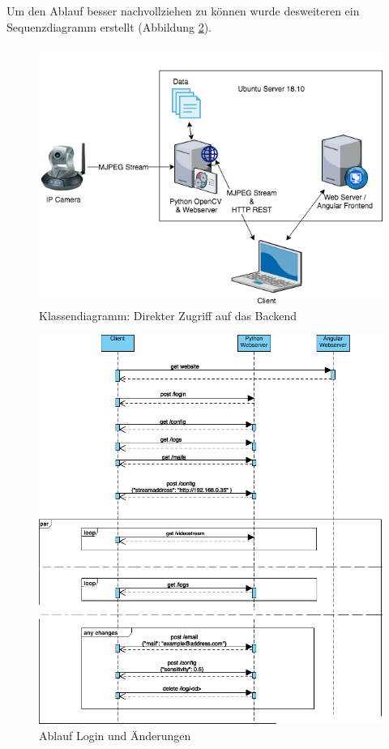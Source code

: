 Um den Ablauf besser nachvollziehen zu können wurde desweiteren ein Sequenzdiagramm erstellt (Abbildung \ref{img:sequencediagram}).

\begin{figure}[]
	\centering
	\includegraphics[width=\textwidth]{content/pictures/architecture-change.png}
	\caption{Klassendiagramm: Direkter Zugriff auf das Backend}
	\label{img:architecture-change}
\end{figure}

\begin{figure}[]
	\centering
	\includegraphics[width=\textwidth]{content/pictures/sequencediagram.png}
	\caption{Ablauf Login und Änderungen}
	\label{img:sequencediagram}
\end{figure}